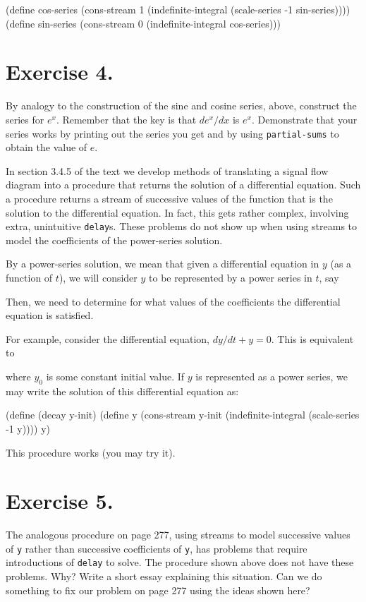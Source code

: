 \beginlisp
(define cos-series
  (cons-stream 1
               (indefinite-integral (scale-series -1
                                                  sin-series))))
\pbrk
(define sin-series
  (cons-stream 0
               (indefinite-integral cos-series)))
\endlisp

\section{Exercise 4.}
By analogy to the construction of the sine and cosine series, above,
construct the series for $e^x$.  Remember that the key is that $de^x/dx$
is $e^x$.  Demonstrate that your series works by printing out the series
you get and by using {\tt partial-sums} to obtain the value of $e$.




\vskip 20pt

In section 3.4.5 of the text we develop methods of translating a
signal flow diagram into a procedure that returns the solution of a
differential equation.  Such a procedure returns a stream of
successive values of the function that is the solution to the
differential equation. In
fact, this gets rather complex, involving extra, unintuitive {\tt delay}s.
These problems do not show up when using streams to model the
coefficients of the power-series solution.  

By a power-series solution, we mean that given a differential equation
in $y$ (as a function of $t$), we will consider $y$ to be represented by
a power series in $t$, say


\vpar
Then, we need to determine for what values of the coefficients the
differential equation is satisfied.


For example, consider the differential equation, $dy/dt+y=0$.  This is
equivalent to 

where $y_0$ is some constant initial value.  If $y$ is represented as a
power series, we may write the solution of this differential equation as:

\beginlisp
(define (decay y-init)
  (define y
    (cons-stream y-init
                 (indefinite-integral (scale-series -1 y))))
  y)
\endlisp

This procedure works (you may try it).

\section{Exercise 5.}
The analogous procedure on page 277, using streams to model
successive values of {\tt y} rather than successive coefficients of {\tt y},
has
problems that require introductions of {\tt delay} to solve.  The procedure
shown above does not have these problems.  Why?  Write a short essay
explaining this situation.  Can we do something to fix our problem on
page 277 using the ideas shown here?


